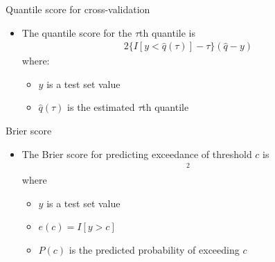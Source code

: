 \documentclass{beamer}
\begin{document}
\begin{frame}{Quantile score for cross-validation}
  \begin{itemize} \setlength{\itemsep}{0.5em}
    \item The quantile score for the $\tau$th quantile is
    \begin{align*}
      2 \{ I[y < \widehat{q}(\tau)] - \tau\} (\widehat{q} - y)
    \end{align*}
    where:
    \begin{itemize}
      \item $y$ is a test set value
      \item $\widehat{q}(\tau)$ is the estimated $\tau$th quantile
    \end{itemize}
  \end{itemize}
\end{frame}

\begin{frame}{Brier score}
  \begin{itemize} \setlength{\itemsep}{0.5em}
	\item The Brier score for predicting exceedance of threshold $c$ is
	\begin{align*}
	  [e(c) - P(c)]^2
	\end{align*}
	where
	\begin{itemize}
		\item $y$ is a test set value
		\item $e(c) = I[y > c]$
		\item $P(c)$ is the predicted probability of exceeding $c$
	\end{itemize}
  \end{itemize}
\end{frame}
\end{document}
